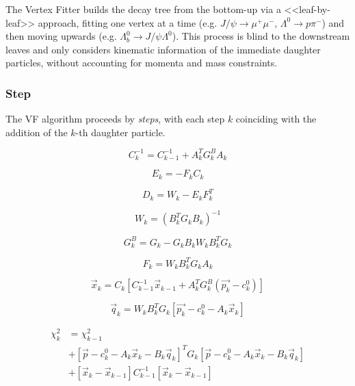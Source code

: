 The Vertex Fitter builds the decay tree from the bottom-up via a <<leaf-by-leaf>> approach, fitting one vertex at a time (e.g. $J/\psi \rightarrow \mu^+ \mu^-$, $\Lambda^0 \rightarrow p \pi^-$) and then moving upwards (e.g. $\Lambda_b^0 \rightarrow J/\psi \Lambda^0$).
This process is blind to the downstream leaves and only considers kinematic information of the immediate daughter particles, without accounting for momenta and mass constraints.

\subsubsection{Step}

The VF algorithm proceeds by \textit{steps}, with each step $k$ coinciding with the addition of the $k$-th daughter particle.

\begin{equation}
C_k^{-1} = C_{k-1}^{-1} + A_k^T G_k^B A_k
\end{equation}

\begin{equation}
E_k = -F_k C_k
\end{equation}

\begin{equation}
D_k = W_k - E_k F_k^T
\end{equation}

\begin{equation}
W_k = {\left(B_k^T G_k B_k\right)}^{-1}
\end{equation}

\begin{equation}
G_k^B = G_k - G_k B_k W_k B_k^T G_k
\end{equation}

\begin{equation}
F_k = W_k B_k^T G_k A_k
\end{equation}

\begin{equation}
\vec{x}_k = C_k \left[
	C_{k-1}^{-1} \vec{x}_{k-1}
	+
	A_k^T G_k^B \left(
		\vec{p_k} - c_k^0	
	\right)
\right]
\end{equation}

\begin{equation}
\vec{q}_k = W_k B_k^T G_k \left[
	\vec{p_k} - c_k^0 - A_k \vec{x}_k
\right]
\end{equation}

\begin{equation}
\begin{aligned}
\chi^2_k &= \chi^2_{k-1} \\
&+
\left[
	\vec{p} - c_k^0 - A_k \vec{x}_k - B_k\vec{q}_k
\right]^T G_k \left[
	\vec{p} - c_k^0 - A_k \vec{x}_k - B_k\vec{q}_k
\right] \\
&+
\left[
	\vec{x}_k - \vec{x}_{k-1}
\right] C_{k-1}^{-1} \left[
	\vec{x}_k - \vec{x}_{k-1}
\right]
\end{aligned}
\end{equation}

